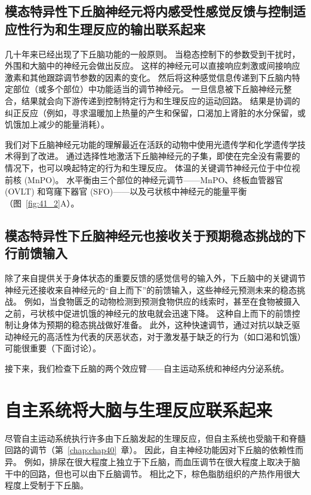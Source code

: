 \subsection{模态特异性下丘脑神经元将内感受性感觉反馈与控制适应性行为和生理反应的输出联系起来}

几十年来已经出现了下丘脑功能的一般原则。
当稳态控制下的参数受到干扰时，外围和大脑中的神经元会做出反应。
这样的神经元可以直接响应刺激或间接响应激素和其他跟踪调节参数的因素的变化。
然后将这种感觉信息传递到下丘脑内特定部位（或多个部位）中功能适当的调节神经元。
一旦信息被下丘脑神经元整合，结果就会向下游传递到控制特定行为和生理反应的运动回路。
结果是协调的纠正反应（例如，寻求温暖加上热量的产生和保留，口渴加上肾脏的水分保留，或饥饿加上减少的能量消耗）。


我们对下丘脑神经元功能的理解最近在活跃的动物中使用光遗传学和化学遗传学技术得到了改进。
通过选择性地激活下丘脑神经元的子集，即使在完全没有需要的情况下，也可以唤起特定的行为和生理反应。
体温的关键调节神经元位于中位视前核 (MnPO)。
水平衡由三个部位的神经元调节——MnPO、终板血管器官 (OVLT) 和穹窿下器官 (SFO)——以及弓状核中神经元的能量平衡（图~\ref{fig:41_2}A）。



\subsection{模态特异性下丘脑神经元也接收关于预期稳态挑战的下行前馈输入}

除了来自提供关于身体状态的重要反馈的感觉信号的输入外，下丘脑中的关键调节神经元还接收来自神经元的“自上而下”的前馈输入，这些神经元预测未来的稳态挑战。
例如，当食物匮乏的动物检测到预测食物供应的线索时，甚至在食物被摄入之前，弓状核中促进饥饿的神经元的放电就会迅速下降。
这种自上而下的前馈控制让身体为预期的稳态挑战做好准备。
此外，这种快速调节，通过对抗以缺乏驱动神经元的高活性为代表的厌恶状态，对于激发基于缺乏的行为（如口渴和饥饿）可能很重要（下面讨论）。


接下来，我们检查下丘脑的两个效应臂——自主运动系统和神经内分泌系统。



\section{自主系统将大脑与生理反应联系起来}

尽管自主运动系统执行许多由下丘脑发起的生理反应，但自主系统也受脑干和脊髓回路的调节（第~\ref{chap:chap40}~章）。
因此，自主神经功能因对下丘脑的依赖性而异。
例如，排尿在很大程度上独立于下丘脑，而血压调节在很大程度上取决于脑干中的回路，但也可以由下丘脑调节。
相比之下，棕色脂肪组织的产热作用很大程度上受制于下丘脑。



